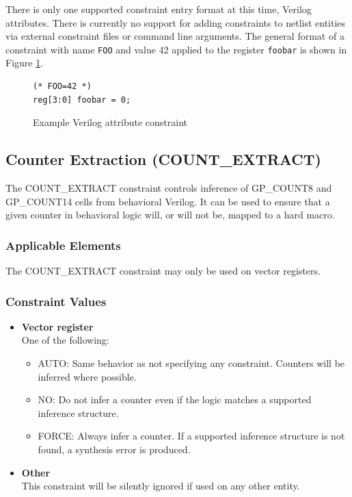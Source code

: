 \documentclass{article}
\begin{document}
There is only one supported constraint entry format at this time, Verilog attributes. There is currently no support for 
adding constraints to netlist entities via external constraint files or command line arguments. The general format of a 
constraint with name \texttt{FOO} and value 42 applied to the register \texttt{foobar} is shown in Figure 
\ref{constraint}.

\begin{figure}[h]
\begin{lstlisting}
(* FOO=42 *)
reg[3:0] foobar = 0;
\end{lstlisting}
\caption{Example Verilog attribute constraint}
\label{constraint}
\end{figure}


\pagebreak
\subsection{Counter Extraction (COUNT\_EXTRACT)}
\label{count-extract}

The COUNT\_EXTRACT constraint controls inference of GP\_COUNT8 and GP\_COUNT14 cells from behavioral Verilog. It can be 
used to ensure that a given counter in behavioral logic will, or will not be, mapped to a hard macro.

\subsubsection{Applicable Elements}
The COUNT\_EXTRACT constraint may only be used on vector registers.

\subsubsection{Constraint Values}
\begin{itemize}
\item {\bfseries Vector register}\\
One of the following:
\begin{itemize}
\item AUTO: Same behavior as not specifying any constraint. Counters will be inferred where possible.
\item NO: Do not infer a counter even if the logic matches a supported inference structure.
\item FORCE: Always infer a counter. If a supported inference structure is not found, a synthesis error is produced.
\end{itemize}
\item {\bfseries Other} \\
This constraint will be silently ignored if used on any other entity.
\end{itemize}
\end{document}
